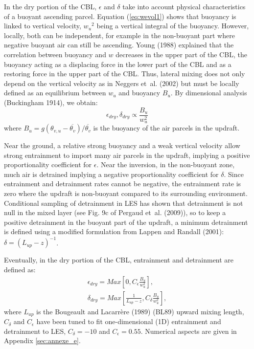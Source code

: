 In the dry portion of the CBL, $\epsilon$ and $\delta$ take into account physical characteristics of a buoyant ascending parcel. Equation (\ref{eq:wevol1}) shows that buoyancy is linked to vertical velocity, ${w_u}^2$ being a vertical integral of the buoyancy. However, locally, both can be independent, for example in the non-buoyant part where negative buoyant air can still be ascending. Young (1988) explained that the correlation between buoyancy and $w$ decreases in the upper part of the CBL, the buoyancy acting as a displacing force in the lower part of the CBL and as a restoring force in the upper part of the CBL. Thus, lateral mixing does not only depend on the vertical velocity as in Neggers et~al. (2002) but must be locally defined as an equilibrium between $w_u$ and buoyancy $B_u$. By dimensional analysis (Buckingham 1914), we obtain:
\begin{equation}
\epsilon_{dry},\delta_{dry} \propto \frac{B_u}{w_u^2} 
\label{eq:ent_delt_BW}
\end{equation}
where $B_u=g(\theta_{v,u}-\overline{\theta_v})/\overline{\theta_v}$ is the buoyancy of the air parcels in the updraft.

Near the ground, a relative strong buoyancy and a weak vertical velocity allow strong entrainment to import many air parcels in the updraft, implying a positive proportionality coefficient for $\epsilon$. Near the inversion, in the non-buoyant zone, much air is detrained implying a negative proportionality coefficient for $\delta$. Since entrainment and detrainment rates cannot be negative, the entrainment rate is zero where the updraft is non-buoyant compared to its surrounding environment. Conditional sampling of detrainment in LES has shown that detrainment is not null in the mixed layer (see Fig. 9c of Pergaud et~al. (2009)), so to keep a positive detrainment in the buoyant part of the updraft, a minimum detrainment is defined using a modified formulation from Lappen and Randall (2001): $\delta=(L_{up}-z)^{-1}$. 

Eventually, in the dry portion of the CBL, entrainment and detrainment are defined as:
\begin{eqnarray}
\epsilon_{dry} = Max\left[0,C_{\epsilon} \frac{B_u}{w_u^2} \right],  \\
\delta_{dry} = Max\left[\frac{1}{L_{up}-z}, C_{\delta} \frac{B_u}{w_u^2} \right],
\label{eq:eps_ent_delt}
\end{eqnarray}
where $L_{up}$ is the Bougeault and Lacarr\`ere (1989) (BL89) upward mixing length, $C_{\delta}$ and $C_{\epsilon}$ have been tuned to fit one-dimensional (1D) entrainment and detrainment to LES, $C_{\delta}=-10$ and $C_{\epsilon}=0.55$. Numerical aspects are given in Appendix \ref{sec:annexe_e}. 

